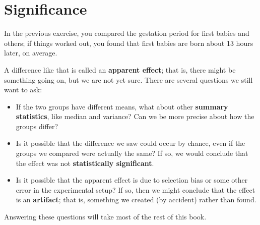 \documentclass[12pt]{book}
\begin{document}
\section{Significance}

In the previous exercise, you compared the gestation period for first
babies and others; if things worked out, you found that first
babies are born about 13 hours later, on average.

A difference like that is called an {\bf apparent effect}; that is,
there might be something going on, but we are not yet sure.  There are
several questions we still want to ask:

\begin{itemize}

\item If the two groups have different means, what about other {\bf
  summary statistics}, like median and variance?  Can we be more
  precise about how the groups differ?

\item Is it possible that the difference we saw could occur by chance,
  even if the groups we compared were actually the same?  If so,
  we would conclude that the effect was not {\bf statistically
    significant}.


\item Is it possible that the apparent effect is due to selection bias or
  some other error in the experimental setup?  If so, then we might
  conclude that the effect is an {\bf artifact}; that is, something we
  created (by accident) rather than found. 

\end{itemize}

Answering these questions will take most of the rest of this book.
\end{document}
